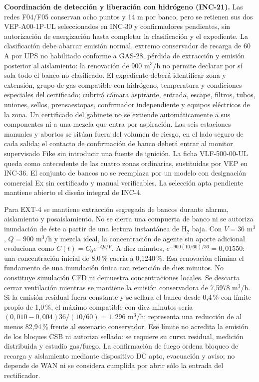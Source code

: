 \textbf{Coordinación de detección y liberación con hidrógeno (INC-21).}\label{sec:sd4-inc21}
Las redes F04/F05 conservan ocho puntos y 14 m por banco, pero se retienen sus dos VEP-A00-1P-UL seleccionados en INC-30 y confirmadores pendientes, sin autorización de energización hasta completar la clasificación y el expediente. La clasificación debe abarcar emisión normal, extremo conservador de recarga de 60 A por UPS no habilitado conforme a GAS-28, pérdida de extracción y emisión posterior al aislamiento: la renovación de 900 m$^3$/h no permite declarar por sí sola todo el banco no clasificado. El expediente deberá identificar zona y extensión, grupo de gas compatible con hidrógeno, temperatura y condiciones especiales del certificado; cubrirá cámara aspirante, entrada, escape, filtros, tubos, uniones, sellos, prensaestopas, confirmador independiente y equipos eléctricos de la zona. Un certificado del gabinete no se extiende automáticamente a sus componentes ni a una mezcla que entra por aspiración. Las seis estaciones manuales y abortos se sitúan fuera del volumen de riesgo, en el lado seguro de cada salida; el contacto de confirmación de banco deberá entrar al monitor supervisado Fike sin introducir una fuente de ignición. La ficha VLF-500-00-UL queda como antecedente de las cuatro zonas ordinarias, sustituidas por VEP en INC-36. El conjunto de bancos no se reemplaza por un modelo con designación comercial Ex sin certificado y manual verificables. La selección apta pendiente mantiene abierto el diseño integral de INC-4.

Para EXT-4 se mantiene extracción segregada de bancos durante alarma, aislamiento y posaislamiento. No se cierra una compuerta de banco ni se autoriza inundación de éste a partir de una lectura instantánea de H$_2$ baja. Con $V=36$ m$^3$, $Q=900$ m$^3$/h y mezcla ideal, la concentración de agente sin aporte adicional evoluciona como $C(t)=C_0e^{-Qt/V}$. A diez minutos, $e^{-900(10/60)/36}=0,01550$: una concentración inicial de 8,0\,\% caería a 0,1240\,\%. Esa renovación elimina el fundamento de una inundación única con retención de diez minutos. No constituye simulación CFD ni demuestra concentraciones locales. Se descarta cerrar ventilación mientras se mantiene la emisión conservadora de 7,5978 m$^3$/h. Si la emisión residual fuera constante y se sellara el banco desde 0,4\,\% con límite propio de 1,0\,\%, el máximo compatible con diez minutos sería $(0,010-0,004)36/(10/60)=1,296$ m$^3$/h; representa una reducción de al menos 82,94\,\% frente al escenario conservador. Ese límite no acredita la emisión de los bloques CSB ni autoriza sellado: se requiere su curva residual, medición distribuida y estudio gas/fuego. La confirmación de fuego ordena bloqueo de recarga y aislamiento mediante dispositivo DC apto, evacuación y aviso; no depende de WAN ni se considera cumplida por abrir sólo la entrada del rectificador.

